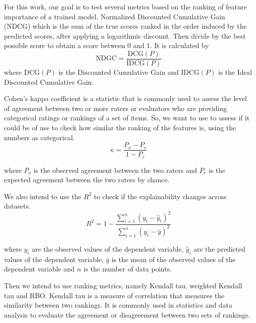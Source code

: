 
For this work, our goal is to test several metrics based on the ranking of feature importance of a trained model. Normalized Discounted Cumulative Gain (NDCG) \cite{wangTheoreticalAnalysisNDCG} which is the sum of the true scores ranked in the order induced by the predicted scores, after applying a logarithmic discount. Then divide by the best possible score to obtain a score between 0 and 1. It is calculated by
\[
\text{{NDGC}} = \frac{{\text{{DCG}}(P)}}{{\text{{IDCG}}(P)}}
\]
where $\text{{DCG}}(P)$ is the Discounted Cumulative Gain and $\text{{IDCG}}(P)$ is the Ideal Discounted Cumulative Gain. 

Cohen's kappa coefficient \cite{doi:10.1177/001316446002000104}  is a statistic that is commonly used to assess the level of agreement between two or more raters or evaluators who are providing categorical ratings or rankings of a set of items. So, we want to use to assess if it could be of use to check how similar the ranking of the features is, using the numbers as categorical.
\[
\kappa = \frac{{P_o - P_e}}{{1 - P_e}}
\]

where \(P_o\) is the observed agreement between the two raters and \(P_e\) is the expected agreement between the two raters by chance.

We also intend to use the $R^2$ to check if the explainability changes across datasets.
\[
R^2 = 1 - \frac{{\sum_{i=1}^n (y_i - \hat{y}_i)^2}}{{\sum_{i=1}^n (y_i - \bar{y})^2}}
\]

where \(y_i\) are the observed values of the dependent variable, \(\hat{y}_i\) are the predicted values of the dependent variable, \(\bar{y}\) is the mean of the observed values of the dependent variable and \(n\) is the number of data points.

Then we intend to use ranking metrics, namely Kendall tau, weighted Kendall tau and RBO.
Kendall tau is a measure of correlation that measures the similarity between two rankings. It is commonly used in statistics and data analysis to evaluate the agreement or disagreement between two sets of rankings.

